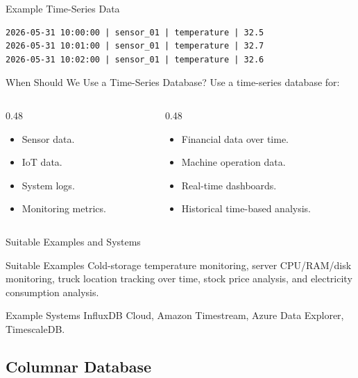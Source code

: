 \documentclass[aspectratio=169,11pt]{beamer}
\newcommand{\smallitem}{\setlength{\itemsep}{2pt}\setlength{\parskip}{0pt}}
\begin{document}
\begin{frame}[fragile]{Example Time-Series Data}
\small
\begin{verbatim}
2026-05-31 10:00:00 | sensor_01 | temperature | 32.5
2026-05-31 10:01:00 | sensor_01 | temperature | 32.7
2026-05-31 10:02:00 | sensor_01 | temperature | 32.6
\end{verbatim}
\end{frame}

\begin{frame}{When Should We Use a Time-Series Database?}
Use a time-series database for:
\begin{columns}[T]
\begin{column}{0.48\textwidth}
\begin{itemize}
  \smallitem
  \item Sensor data.
  \item IoT data.
  \item System logs.
  \item Monitoring metrics.
\end{itemize}
\end{column}
\begin{column}{0.48\textwidth}
\begin{itemize}
  \smallitem
  \item Financial data over time.
  \item Machine operation data.
  \item Real-time dashboards.
  \item Historical time-based analysis.
\end{itemize}
\end{column}
\end{columns}
\end{frame}

\begin{frame}{Suitable Examples and Systems}
\begin{block}{Suitable Examples}
Cold-storage temperature monitoring, server CPU/RAM/disk monitoring, truck location tracking over time, stock price analysis, and electricity consumption analysis.
\end{block}

\begin{block}{Example Systems}
InfluxDB Cloud, Amazon Timestream, Azure Data Explorer, TimescaleDB.
\end{block}
\end{frame}

\subsection{Columnar Database}
\end{document}
